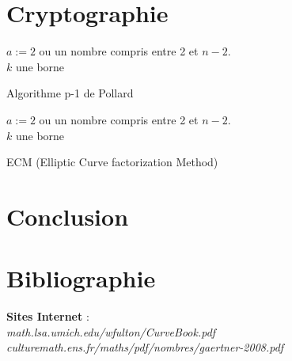 \documentclass[a4paper]{article}
\begin{document}
\section{Cryptographie}
\begin{algorithm}[H]
 $a := 2$ ou un nombre compris entre 2 et $n-2$. \\
 $k$ une borne \\
 \caption{Algorithme p-1 de Pollard}
\end{algorithm}


\begin{algorithm}[H]
 $a := 2$ ou un nombre compris entre 2 et $n-2$. \\
 $k$ une borne \\
 \caption{ECM (Elliptic Curve factorization Method)}
\end{algorithm}
\cite{ref10}
\cite{ref9}



\newpage
\section*{Conclusion}
\newpage

\appendix

\newpage
\section{Bibliographie} 


\nocite{ref}
\nocite{ref2}
\nocite{ref8}
\textbf{Sites Internet} :
\\ 
\emph{math.lsa.umich.edu/wfulton/CurveBook.pdf} \\
\emph{culturemath.ens.fr/maths/pdf/nombres/gaertner-2008.pdf} 
\end{document}
